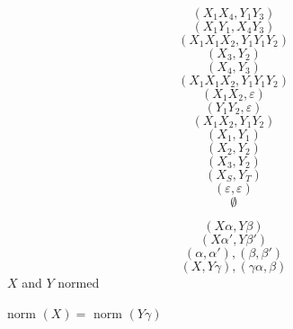 \documentclass{article}
\begin{document}
$$(X_1X_4, Y_1Y_3)$$
$$(X_1Y_1,X_4Y_3)$$
$$(X_1X_1X_2,Y_1Y_1Y_2)$$
$$(X_3,Y_2)$$
$$(X_4,Y_3)$$
$$(X_1X_1X_2,Y_1Y_1Y_2)$$
$$(X_1X_2,\varepsilon)$$
$$(Y_1Y_2,\varepsilon)$$
$$(X_1X_2,Y_1Y_2)$$
$$(X_1,Y_1)$$
$$(X_2,Y_2)$$
$$(X_3,Y_2)$$
$$(X_S,Y_T)$$
$$(\varepsilon,\varepsilon)$$
$$\emptyset$$

$$(X\alpha, Y\beta)$$
$$(X\alpha', Y\beta')$$
$$(\alpha, \alpha'), (\beta,\beta')$$
$$(X,Y\gamma), (\gamma \alpha, \beta)$$
$X$ and $Y$ normed

norm $(X)=$ norm $(Y\gamma)$
\end{document}
